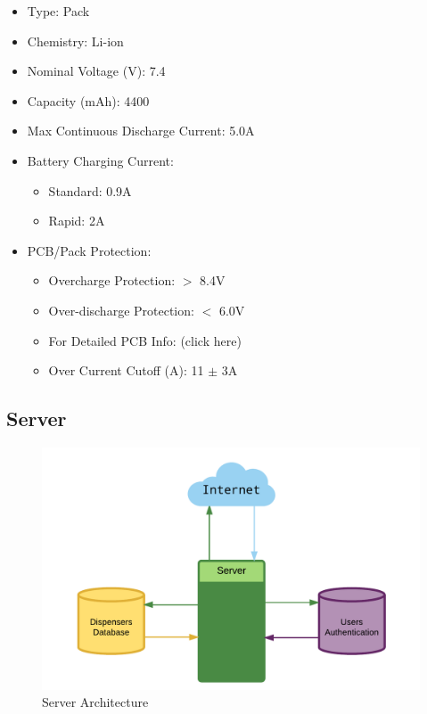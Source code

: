 \documentclass[12pt]{article}
\begin{document}
\begin{itemize}
  \item Type: Pack
  \item Chemistry: Li-ion
  \item Nominal Voltage (V): 7.4
  \item Capacity (mAh): 4400
  \item Max Continuous Discharge Current: 5.0A
  \item Battery Charging Current:
  \begin{itemize}
    \item Standard: 0.9A
    \item Rapid: 2A
  \end{itemize}
  \item PCB/Pack Protection:
  \begin{itemize}
    \item Overcharge Protection: $>$ 8.4V
    \item Over-discharge Protection: $<$ 6.0V
    \item For Detailed PCB Info: (click here)
    \item Over Current Cutoff (A): 11 $\pm$ 3A
  \end{itemize}
\end{itemize}

\subsection{Server}

\begin{figure}[!htb]
  \includegraphics[width=\textwidth]{Figures/ArchitectureServer}
  \caption{Server Architecture}
  \label{fig:ServArchitecture}
\end{figure}
\end{document}
